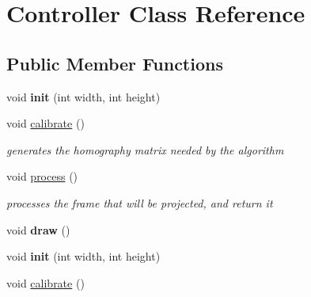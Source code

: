 \hypertarget{class_controller}{\section{Controller Class Reference}
\label{class_controller}
}
\subsection*{Public Member Functions}
\begin{DoxyCompactItemize}
\item 
\hypertarget{class_controller_a53e2dfd2b170b86a607fb23f69c13859}{void {\bfseries init} (int width, int height)}\label{class_controller_a53e2dfd2b170b86a607fb23f69c13859}

\item 
\hypertarget{class_controller_a3281d6167b17007535c5414c5c409b4b}{void \hyperlink{class_controller_a3281d6167b17007535c5414c5c409b4b}{calibrate} ()}\label{class_controller_a3281d6167b17007535c5414c5c409b4b}

\begin{DoxyCompactList}\small\item\em generates the homography matrix needed by the algorithm \end{DoxyCompactList}\item 
\hypertarget{class_controller_a7ac58195c3342b7de52b762c0d759a3c}{void \hyperlink{class_controller_a7ac58195c3342b7de52b762c0d759a3c}{process} ()}\label{class_controller_a7ac58195c3342b7de52b762c0d759a3c}

\begin{DoxyCompactList}\small\item\em processes the frame that will be projected, and return it \end{DoxyCompactList}\item 
\hypertarget{class_controller_a02fdbce18ccb7becaa2aa9fd8fc4aa2b}{void {\bfseries draw} ()}\label{class_controller_a02fdbce18ccb7becaa2aa9fd8fc4aa2b}

\item 
\hypertarget{class_controller_a53e2dfd2b170b86a607fb23f69c13859}{void {\bfseries init} (int width, int height)}\label{class_controller_a53e2dfd2b170b86a607fb23f69c13859}

\item 
\hypertarget{class_controller_a3281d6167b17007535c5414c5c409b4b}{void \hyperlink{class_controller_a3281d6167b17007535c5414c5c409b4b}{calibrate} ()}\label{class_controller_a3281d6167b17007535c5414c5c409b4b}


\end{DoxyCompactItemize}
